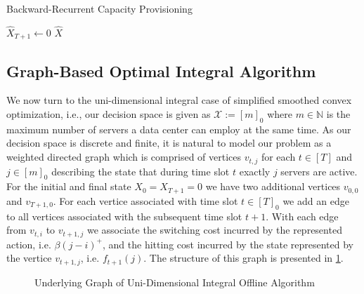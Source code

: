 \begin{algorithm}
    \caption{Backward-Recurrent Capacity Provisioning~\cite{Lin2011}}\label{alg:brcp}
    $\hat{X}_{T+1} \gets 0$\;
    \Return $\hat{X}$\;
\end{algorithm}

\subsection{Graph-Based Optimal Integral Algorithm}\label{section:offline_algorithms:ud:graph_based}

We now turn to the uni-dimensional integral case of simplified smoothed convex optimization, i.e., our decision space is given as $\mathcal{X} := [m]_0$ where $m \in \mathbb{N}$ is the maximum number of servers a data center can employ at the same time. As our decision space is discrete and finite, it is natural to model our problem as a weighted directed graph which is comprised of vertices $v_{t,j}$ for each $t \in [T]$ and $j \in [m]_0$ describing the state that during time slot $t$ exactly $j$ servers are active. For the initial and final state $X_0 = X_{T+1} = 0$ we have two additional vertices $v_{0,0}$ and $v_{T+1,0}$. For each vertice associated with time slot $t \in [T]_0$ we add an edge to all vertices associated with the subsequent time slot $t + 1$. With each edge from $v_{t,i}$ to $v_{t+1,j}$ we associate the switching cost incurred by the represented action, i.e. $\beta (j - i)^+$, and the hitting cost incurred by the state represented by the vertice $v_{t+1,j}$, i.e. $f_{t+1}(j)$. The structure of this graph is presented in \cref{fig:underlying_graph_of_uni_dimensional_integral_offline_algorithm}.

\begin{figure}
    \centering
    [TODO]
    \caption{Underlying Graph of Uni-Dimensional Integral Offline Algorithm}
    \label{fig:underlying_graph_of_uni_dimensional_integral_offline_algorithm}
\end{figure}


